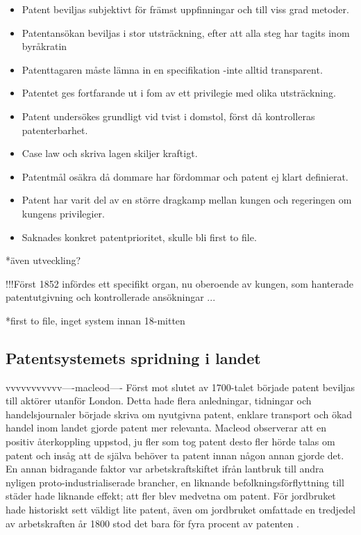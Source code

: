\begin{itemize}
	\item Patent beviljas subjektivt för främst uppfinningar och till viss grad metoder.
	\item Patentansökan beviljas i stor utsträckning, efter att alla steg har tagits inom byråkratin
	\item Patenttagaren måste lämna in en specifikation -inte alltid transparent.
	\item Patentet ges fortfarande ut i fom av ett privilegie med olika utsträckning.
	\item Patent undersökes grundligt vid tvist i domstol, först då kontrolleras patenterbarhet.
	\item Case law och skriva lagen skiljer kraftigt.
	\item Patentmål osäkra då dommare har fördommar och patent ej klart definierat.
	\item Patent har varit del av en större dragkamp mellan kungen och regeringen om kungens privilegier. 
	\item Saknades konkret patentprioritet, skulle bli first to file.
\end{itemize}

*även utveckling?

!!!Först 1852 infördes ett specifikt organ, nu oberoende av kungen, som hanterade patentutgivning och kontrollerade ansökningar ...

*first to file, inget system innan 18-mitten


\subsection{Patentsystemets spridning i landet}
\label{sub:patentsystemets_spridning_i_landet}

vvvvvvvvvvv----macleod----
Först mot slutet av 1700-talet började patent beviljas till aktörer utanför London. Detta hade flera
anledningar, tidningar och handelsjournaler började skriva om nyutgivna patent, enklare transport och
ökad handel inom landet gjorde patent mer relevanta\cite{macleod}. Macleod observerar att en positiv återkoppling uppstod, ju fler som tog
patent desto fler hörde talas om patent och insåg att de själva behöver ta patent innan någon annan gjorde
det. En annan bidragande faktor var arbetskraftskiftet ifrån lantbruk till andra nyligen
proto-industrialiserade brancher, en liknande befolkningsförflyttning till städer hade liknande effekt;
att fler blev medvetna om patent\cite{macleod}. För jordbruket hade historiskt sett väldigt lite patent, även om
jordbruket omfattade en tredjedel av arbetskraften år 1800 stod det bara för fyra procent av patenten
\cite{macleod2}.

